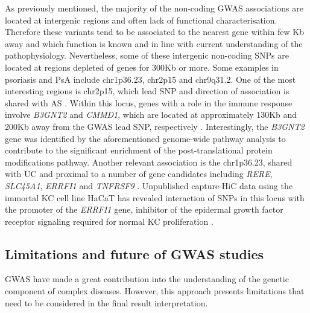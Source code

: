 As previously mentioned, the majority of the non-coding GWAS associations are located at intergenic regions and often lack of functional characterisation. Therefore these variants tend to be associated to the nearest gene within few Kb away and which function is known and in line with current understanding of the pathophysiology. Nevertheless, some of these intergenic non-coding SNPs are located at regions depleted of genes for 300Kb or more. Some examples in psoriasis and PsA include chr1p36.23, chr2p15 and chr9q31.2. One of the most interesting regions is chr2p15, which lead SNP and direction of association is shared with AS \parencite{Immunobase}. Within this locus, genes with a role in the immune response involve \textit{B3GNT2} and \textit{CMMD1}, which are located at approximately 130Kb and 200Kb away from the GWAS lead SNP, respectively  \parencite{Maine2007, Tsoi2012}. Interestingly, the \textit{B3GNT2} gene was identified by the aforementioned genome-wide pathway analysis to contribute to the significant enrichment of the post-translational protein modifications pathway.
Another relevant association is the chr1p36.23, shared with UC and proximal to a number of gene candidates including \textit{RERE}, \textit{SLC45A1}, \textit{ERRFI1} and \textit{TNFRSF9} \parencite{Tsoi2012}. Unpublished capture-HiC data using the immortal KC cell line  HaCaT has revealed interaction of SNPs in this locus with the promoter of the \textit{ERRFI1} gene, inhibitor of the epidermal growth factor receptor signaling required for normal KC proliferation \parencite{Ray-Jones2017}. %

 

  

\subsection{Limitations and future of GWAS studies}

GWAS have made a great contribution into the understanding of the genetic component of complex diseases. However, this approach presents limitations that need to be considered in the final result interpretation. 

